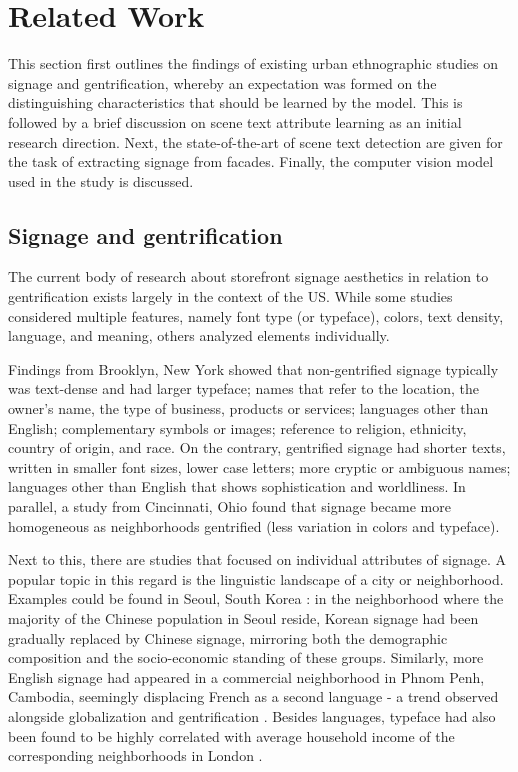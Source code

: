 \section{Related Work}
\label{sec:related_work}

This section first outlines the findings of existing urban ethnographic studies on signage and gentrification, whereby an expectation was formed on the distinguishing characteristics that should be learned by the model. This is followed by a brief discussion on scene text attribute learning as an initial research direction. Next, the state-of-the-art of scene text detection are given for the task of extracting signage from facades. Finally, the computer vision model used in the study is discussed.

\subsection{Signage and gentrification}
\label{subsec:related_signs}

The current body of research about storefront signage aesthetics in relation to gentrification exists largely in the context of the US. While some studies considered multiple features, namely font type (or typeface), colors, text density, language, and meaning, others analyzed elements individually.

Findings from Brooklyn, New York\cite{trinch_signsays_2017, snajdr_oldschool_2018, snajdr_preserve_2022} showed that non-gentrified signage typically was text-dense and had larger typeface; names that refer to the location, the owner's name, the type of business, products or services; languages other than English; complementary symbols or images; reference to religion, ethnicity, country of origin, and race. On the contrary, gentrified signage had shorter texts, written in smaller font sizes, lower case letters; more cryptic or ambiguous names; languages other than English that shows sophistication and worldliness. In parallel, a study from Cincinnati, Ohio \cite{rahman_signage_2020} found that signage became more homogeneous as neighborhoods gentrified (less variation in colors and typeface).

Next to this, there are studies that focused on individual attributes of signage. A popular topic in this regard is the linguistic landscape of a city or neighborhood. Examples could be found in Seoul, South Korea \cite{hong_linguistic_2020}: in the neighborhood where the majority of the Chinese population in Seoul reside, Korean signage had been gradually replaced by Chinese signage, mirroring both the demographic composition and the socio-economic standing of these groups. Similarly, more English signage had appeared in a commercial neighborhood in Phnom Penh, Cambodia, seemingly displacing French as a second language - a trend observed alongside globalization and gentrification \cite{kasanga_map_2012}. Besides languages, typeface had also been found to be highly correlated with average household income of the corresponding neighborhoods in London \cite{ma_typef_2019}.

